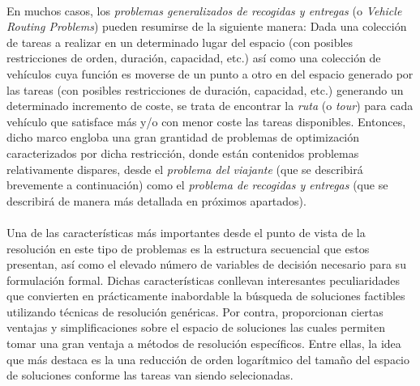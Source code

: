 \documentclass{subfiles}
\begin{document}
        \paragraph{}
        En muchos casos, los \emph{problemas generalizados de recogidas y entregas} (o \emph{Vehicle Routing Problems}) pueden resumirse de la siguiente manera: Dada una colección de tareas a realizar en un determinado lugar del espacio (con posibles restricciones de orden, duración, capacidad, etc.) así como una colección de vehículos cuya función es moverse de un punto a otro en del espacio generado por las tareas (con posibles restricciones de duración, capacidad, etc.) generando un determinado incremento de coste, se trata de encontrar la \emph{ruta} (o \emph{tour}) para cada vehículo que satisface más y/o con menor coste las tareas disponibles. Entonces, dicho marco engloba una gran grantidad de problemas de optimización caracterizados por dicha restricción, donde están contenidos problemas relativamente dispares, desde el \emph{problema del viajante} (que se describirá brevemente a continuación) como el \emph{problema de recogidas y entregas} (que se describirá de manera más detallada en próximos apartados).

        \paragraph{}
        Una de las características más importantes desde el punto de vista de la resolución en este tipo de problemas es la estructura secuencial que estos presentan, así como el elevado número de variables de decisión necesario para su formulación formal. Dichas características conllevan interesantes peculiaridades que convierten en prácticamente inabordable la búsqueda de soluciones factibles utilizando técnicas de resolución genéricas. Por contra, proporcionan ciertas ventajas y simplificaciones sobre el espacio de soluciones las cuales permiten tomar una gran ventaja a métodos de resolución específicos. Entre ellas, la idea que más destaca es la una reducción de orden logarítmico del tamaño del espacio de soluciones conforme las tareas van siendo selecionadas.
\end{document}
